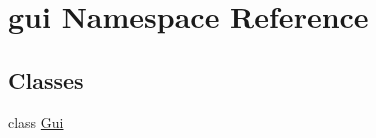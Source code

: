 \hypertarget{namespacegui}{}\section{gui Namespace Reference}
\label{namespacegui}
\subsection*{Classes}
\begin{DoxyCompactItemize}
\item 
class \mbox{\hyperlink{classgui_1_1_gui}{Gui}}
\end{DoxyCompactItemize}
